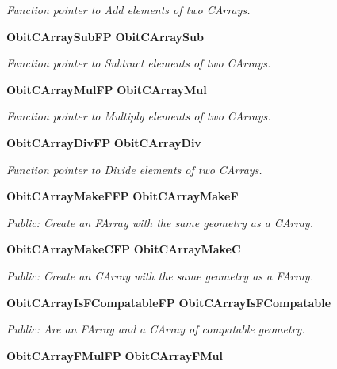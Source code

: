\begin{CompactItemize}
\begin{CompactList}\small\item\em Function pointer to Add elements of two CArrays. \item\end{CompactList}\item 
{\bf Obit\-CArray\-Sub\-FP} {\bf Obit\-CArray\-Sub}
\begin{CompactList}\small\item\em Function pointer to Subtract elements of two CArrays. \item\end{CompactList}\item 
{\bf Obit\-CArray\-Mul\-FP} {\bf Obit\-CArray\-Mul}
\begin{CompactList}\small\item\em Function pointer to Multiply elements of two CArrays. \item\end{CompactList}\item 
{\bf Obit\-CArray\-Div\-FP} {\bf Obit\-CArray\-Div}
\begin{CompactList}\small\item\em Function pointer to Divide elements of two CArrays. \item\end{CompactList}\item 
{\bf Obit\-CArray\-Make\-FFP} {\bf Obit\-CArray\-Make\-F}
\begin{CompactList}\small\item\em Public: Create an FArray with the same geometry as a CArray. \item\end{CompactList}\item 
{\bf Obit\-CArray\-Make\-CFP} {\bf Obit\-CArray\-Make\-C}
\begin{CompactList}\small\item\em Public: Create an CArray with the same geometry as a FArray. \item\end{CompactList}\item 
{\bf Obit\-CArray\-Is\-FCompatable\-FP} {\bf Obit\-CArray\-Is\-FCompatable}
\begin{CompactList}\small\item\em Public: Are an FArray and a CArray of compatable geometry. \item\end{CompactList}\item 
{\bf Obit\-CArray\-FMul\-FP} {\bf Obit\-CArray\-FMul}

\end{CompactItemize}
